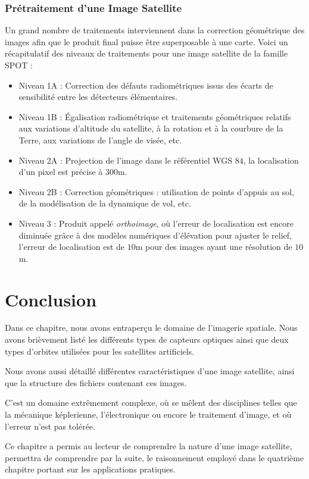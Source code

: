 \documentclass[a4paper, 11pt]{report}
\begin{document}
\subsubsection{Prétraitement d'une Image Satellite}
Un grand nombre de traitements interviennent dans la correction géométrique des images afin que le produit final puisse être superposable à une carte.
Voici un récapitulatif des niveaux de traitements pour une image satellite de la famille SPOT \citep{Space2010}:
\begin{itemize}
	\item Niveau 1A : Correction des défauts radiométriques issus des écarts de sensibilité entre les détecteurs élémentaires.
	\item Niveau 1B : Égalisation radiométrique et traitements géométriques relatifs aux variations d'altitude du satellite, à la rotation et à la courbure de la Terre, aux variations de l'angle de visée, etc.
	\item Niveau 2A : Projection de l'image dans le référentiel WGS $84$, la localisation d'un pixel est précise à $300$m.
	\item Niveau 2B : Correction géométriques : utilisation de points d'appuis au sol, de la modélisation de la dynamique de vol, etc.
	\item Niveau 3 : Produit appelé \emph{orthoimage}, où l'erreur de localisation est encore diminuée grâce à des modèles numériques d'élévation pour ajuster le relief, l'erreur de localisation est de $10$m pour des images ayant une résolution de $10$m.
\end{itemize}
\section{Conclusion}
Dans ce chapitre, nous avons entraperçu le domaine de l'imagerie spatiale.
Nous avons brièvement listé les différents types de capteurs optiques ainsi que deux types d'orbites utilisées pour les satellites artificiels.

Nous avons aussi détaillé différentes caractéristiques d'une image satellite, ainsi que la structure des fichiers contenant ces images.

C'est un domaine extrêmement complexe, où se mêlent des disciplines telles que la mécanique képlerienne, l'électronique ou encore le traitement d'image, et où l'erreur n'est pas tolérée.

Ce chapitre a permis au lecteur de comprendre la nature d'une image satellite, permettra de comprendre par la suite, le raisonnement employé dans le quatrième chapitre portant sur les applications pratiques.
\end{document}
